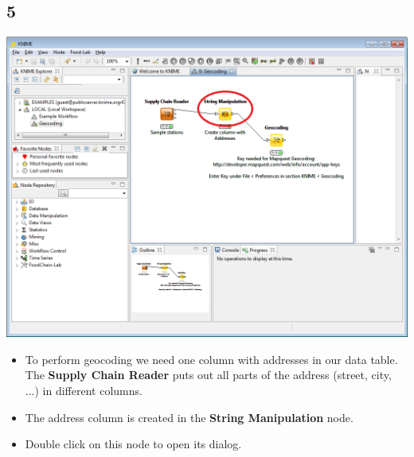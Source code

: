 \documentclass{beamer}
\begin{document}
\subsection{5}
\begin{frame}
	\begin{center}
  		\includegraphics[height=0.6\textheight]{5.png}
	\end{center}
	\begin{itemize}
		\item To perform geocoding we need one column with addresses in our data table. The \textbf{Supply Chain Reader} puts out all parts of the address (street, city, ...) in different columns.
		\item The address column is created in the \textbf{String Manipulation} node.
		\item Double click on this node to open its dialog.
	\end{itemize}
\end{frame}
\end{document}
